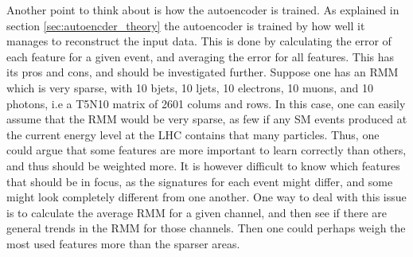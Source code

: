 Another point to think about is how the autoencoder is trained. As explained in section \ref{sec:autoencder_theory}
the autoencoder is trained by how well it manages to reconstruct the input data. This is done by 
calculating the error of each feature for a given event, and averaging the error for all features. 
This has its pros and cons, and should be investigated further. Suppose one has an RMM which is very sparse, 
with 10 bjets, 10 ljets, 10 electrons, 10 muons, and 10 photons, i.e a T5N10 matrix of 2601 colums and rows. 
In this case, one can easily assume that the RMM would be very sparse, as few if any SM events produced 
at the current energy level at the LHC contains that many particles. Thus, one could argue that some features 
are more important to learn correctly than others, and thus should be weighted more. It is however difficult to 
know which features that should be in focus, as the signatures for each event might differ, and some 
might look completely different from one another. One way to deal with this issue is to calculate 
the average RMM for a given channel, and then see if there are general trends in the RMM for those channels. 
Then one could perhaps weigh the most used features more than the sparser areas. 